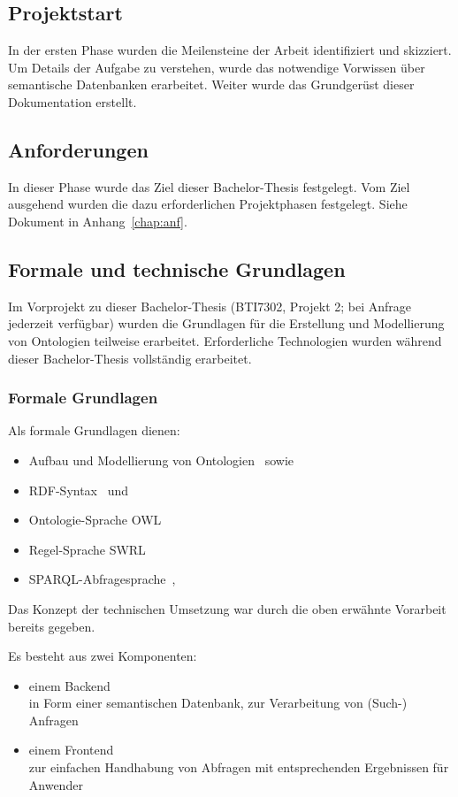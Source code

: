 \subsection{Projektstart}
\label{subsec:projektstart}
In der ersten Phase wurden die Meilensteine der Arbeit identifiziert und skizziert. Um Details der Aufgabe zu verstehen, wurde das notwendige Vorwissen über semantische Datenbanken erarbeitet. Weiter wurde das Grundgerüst dieser Dokumentation erstellt.

\subsection{Anforderungen}
\label{subsec:anforderungen}
In dieser Phase wurde das Ziel dieser Bachelor-Thesis festgelegt. Vom Ziel ausgehend wurden die dazu erforderlichen Projektphasen festgelegt. Siehe Dokument in Anhang~\ref{chap:anf}.

\subsection{Formale und technische Grundlagen}
\label{sub:formale_und_technische_grundlagen}
Im Vorprojekt zu dieser Bachelor-Thesis (BTI7302, Projekt 2; bei Anfrage jederzeit verfügbar) wurden die Grundlagen für die Erstellung und Modellierung von Ontologien teilweise erarbeitet. Erforderliche Technologien wurden während dieser Bachelor-Thesis vollständig erarbeitet.

\subsubsection{Formale Grundlagen}
Als formale Grundlagen dienen:
\begin{itemize}
    \item Aufbau und Modellierung von Ontologien~\citep{IspekOntoBedeutung} sowie~\citep{ISpekOntoGeschichte}
    \item RDF-Syntax~\citep{w3rdf} und~\citep{w3rdf_syntax}
    \item Ontologie-Sprache OWL~\citep{w3owl}
    \item Regel-Sprache SWRL~\citep{swrl}
    \item SPARQL-Abfragesprache~\citep{w3sparql_querylang},~\citep{w3sparql_overview}
\end{itemize}

Das Konzept der technischen Umsetzung war durch die oben erwähnte Vorarbeit bereits gegeben.

Es besteht aus zwei Komponenten:
\begin{itemize}
    \item einem Backend\\
        in Form einer semantischen Datenbank, zur Verarbeitung von (Such-) Anfragen
    \item einem Frontend\\
        zur einfachen Handhabung von Abfragen mit entsprechenden Ergebnissen für Anwender
\end{itemize}

